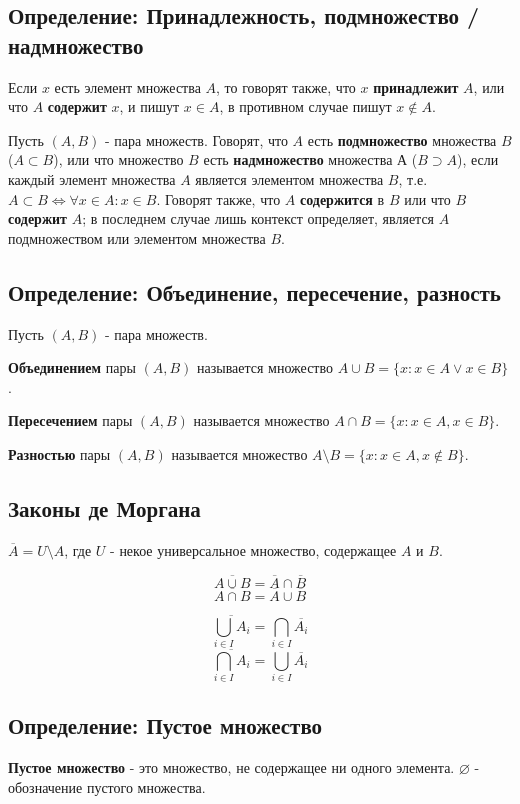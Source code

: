 \documentclass{article}
\begin{document}
\subsection{Определение: Принадлежность, подмножество / надмножество}

Если $x$ есть элемент множества $A$, то говорят также, что $x$ \textbf{принадлежит} $A$, или что $A$ \textbf{содержит} $x$, и пишут $x \in A$, в противном случае пишут $x \notin A$.

Пусть $(A, B)$ - пара множеств. Говорят, что $A$ есть \textbf{подмножество} множества $B$ ($A \subset B$), или что множество $B$ есть \textbf{надмножество} множества А ($B \supset A$), если каждый элемент множества $A$ является элементом множества $B$, т.е. $A \subset B \Leftrightarrow \forall x \in A : x \in B$. Говорят также, что $A$ \textbf{содержится} в $B$ или что $B$ \textbf{содержит} $A$; в последнем случае лишь контекст определяет, является $A$ подмножеством или элементом множества $B$.

\subsection{Определение: Объединение, пересечение, разность}

Пусть $(A, B)$ - пара множеств.

\textbf{Объединением} пары $(A, B)$ называется множество $A \cup B = \{x : x \in A \vee x \in B \}$.

\textbf{Пересечением} пары $(A, B)$ называется множество $A \cap B = \{x : x \in A, x \in B \}$.

\textbf{Разностью} пары $(A, B)$ называется множество $A \setminus B = \{x : x \in A, x \notin B \}$.

\subsection{Законы де Моргана}

$\overline A = U \setminus A$, где $U$ - некое универсальное множество, содержащее $A$ и $B$.

\[\overline{A \cup B} = \overline A \cap \overline B \]
\[\overline{A \cap B} = \overline A \cup \overline B \]

\[\overline{\bigcup_{i\in I} A_i} = \bigcap_{i\in I}\overline{A_i}\]
\[\overline{\bigcap_{i\in I} A_i} = \bigcup_{i\in I}\overline{A_i}\]

\subsection{Определение: Пустое множество}
\textbf{Пустое множество} - это множество, не содержащее ни одного элемента. $\varnothing$ - обозначение пустого множества.
\end{document}
